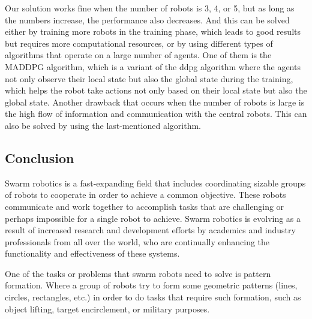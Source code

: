\documentclass[12pt]{extarticle}
\begin{document}
Our solution works fine when the number of robots is 3, 4, or 5, but as long as the numbers increase, the performance also decreases. And this can be solved either by training more robots in the training phase, which leads to good results but requires more computational resources, or by using different types of algorithms that operate on a large number of agents. One of them is the MADDPG algorithm, which is a variant of the ddpg algorithm where the agents not only observe their local state but also the global state during the training, which helps the robot take actions not only based on their local state but also the global state.
Another drawback that occurs when the number of robots is large is the high flow of information and communication with the central robots. This can also be solved by using the last-mentioned algorithm.















\afterpage{\clearpage}
 \newpage
\pagebreak
\hspace{0pt}
\vfill
\begin{center}
\section{Conclusion}
\end{center}
\vfill
\hspace{0pt}

\pagebreak




Swarm robotics is a fast-expanding field that includes coordinating sizable groups of robots to cooperate in order to achieve a common objective. These robots communicate and work together to accomplish tasks that are challenging or perhaps impossible for a single robot to achieve. Swarm robotics is evolving as a result of increased research and development efforts by academics and industry professionals from all over the world, who are continually enhancing the functionality and effectiveness of these systems.



One of the tasks or problems that swarm robots need to solve is pattern formation. Where a group of robots try to form some geometric patterns (lines, circles, rectangles, etc.) in order to do tasks that require such formation, such as object lifting, target encirclement, or military purposes.
\end{document}
